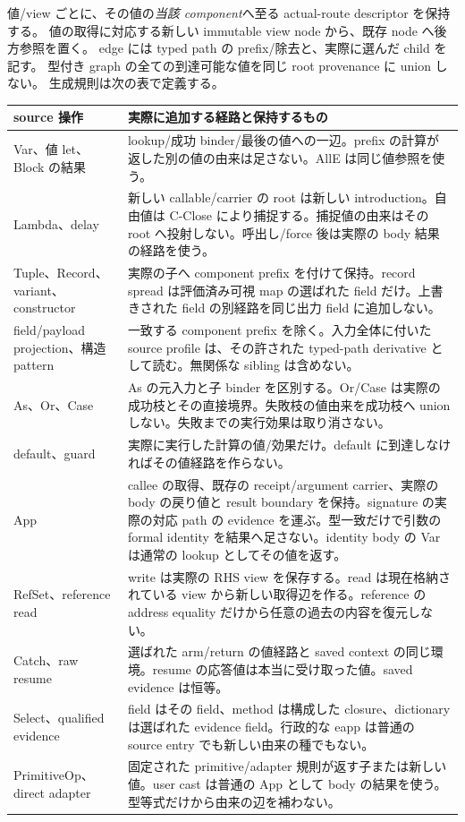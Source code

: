 \documentclass[11pt,a4paper]{article}
\begin{document}
値/view ごとに、その値の\emph{当該 component}へ至る actual-route descriptor を保持する。
値の取得に対応する新しい immutable view node から、既存 node へ後方参照を置く。
edge には typed path の prefix/除去と、実際に選んだ child を記す。
型付き graph の全ての到達可能な値を同じ root provenance に union しない。
生成規則は次の表で定義する。

\begin{longtable}{>{\raggedright\arraybackslash}p{}>{\raggedright\arraybackslash}p{}}
\toprule source 操作 & 実際に追加する経路と保持するもの \\
\midrule\endhead
Var、値 let、Block の結果 & lookup/成功 binder/最後の値への一辺。prefix の計算が返した別の値の由来は足さない。AllE は同じ値参照を使う。\\
Lambda、delay & 新しい callable/carrier の root は新しい introduction。自由値は C-Close により捕捉する。捕捉値の由来はその root へ投射しない。呼出し/force 後は実際の body 結果の経路を使う。\\
Tuple、Record、variant、constructor & 実際の子へ component prefix を付けて保持。record spread は評価済み可視 map の選ばれた field だけ。上書きされた field の別経路を同じ出力 field に追加しない。\\
field/payload projection、構造 pattern & 一致する component prefix を除く。入力全体に付いた source profile は、その許された typed-path derivative として読む。無関係な sibling は含めない。\\
As、Or、Case & As の元入力と子 binder を区別する。Or/Case は実際の成功枝とその直接境界。失敗枝の値由来を成功枝へ union しない。失敗までの実行効果は取り消さない。\\
default、guard & 実際に実行した計算の値/効果だけ。default に到達しなければその値経路を作らない。\\
App & callee の取得、既存の receipt/argument carrier、実際の body の戻り値と result boundary を保持。signature の実際の対応 path の evidence を運ぶ。型一致だけで引数の formal identity を結果へ足さない。identity body の Var は通常の lookup としてその値を返す。\\
RefSet、reference read & write は実際の RHS view を保存する。read は現在格納されている view から新しい取得辺を作る。reference の address equality だけから任意の過去の内容を復元しない。\\
Catch、raw resume & 選ばれた arm/return の値経路と saved context の同じ環境。resume の応答値は本当に受け取った値。saved evidence は恒等。\\
Select、qualified evidence & field はその field、method は構成した closure、dictionary は選ばれた evidence field。行政的な eapp は普通の source entry でも新しい由来の種でもない。\\
PrimitiveOp、direct adapter & 固定された primitive/adapter 規則が返す子または新しい値。user cast は普通の App として body の結果を使う。型等式だけから由来の辺を補わない。\\
\bottomrule
\end{longtable}
\end{document}

